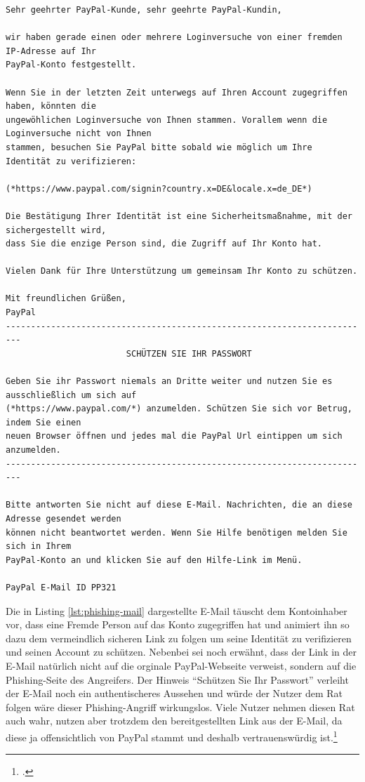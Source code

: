 \begin{scriptsize}
\begin{lstlisting}
Sehr geehrter PayPal-Kunde, sehr geehrte PayPal-Kundin,

wir haben gerade einen oder mehrere Loginversuche von einer fremden IP-Adresse auf Ihr
PayPal-Konto festgestellt.

Wenn Sie in der letzten Zeit unterwegs auf Ihren Account zugegriffen haben, könnten die
ungewöhlichen Loginversuche von Ihnen stammen. Vorallem wenn die Loginversuche nicht von Ihnen
stammen, besuchen Sie PayPal bitte sobald wie möglich um Ihre Identität zu verifizieren:

(*https://www.paypal.com/signin?country.x=DE&locale.x=de_DE*)

Die Bestätigung Ihrer Identität ist eine Sicherheitsmaßnahme, mit der sichergestellt wird,
dass Sie die enzige Person sind, die Zugriff auf Ihr Konto hat.

Vielen Dank für Ihre Unterstützung um gemeinsam Ihr Konto zu schützen.

Mit freundlichen Grüßen,
PayPal
-------------------------------------------------------------------------
                        SCHÜTZEN SIE IHR PASSWORT

Geben Sie ihr Passwort niemals an Dritte weiter und nutzen Sie es ausschließlich um sich auf
(*https://www.paypal.com/*) anzumelden. Schützen Sie sich vor Betrug, indem Sie einen
neuen Browser öffnen und jedes mal die PayPal Url eintippen um sich anzumelden.
-------------------------------------------------------------------------

Bitte antworten Sie nicht auf diese E-Mail. Nachrichten, die an diese Adresse gesendet werden
können nicht beantwortet werden. Wenn Sie Hilfe benötigen melden Sie sich in Ihrem
PayPal-Konto an und klicken Sie auf den Hilfe-Link im Menü. 

PayPal E-Mail ID PP321
\end{lstlisting}
\end{scriptsize}

Die in Listing \ref{lst:phishing-mail} dargestellte E-Mail täuscht dem Kontoinhaber vor, dass eine
Fremde Person auf das Konto zugegriffen hat und animiert ihn so dazu dem vermeindlich sicheren Link
zu folgen um seine Identität zu verifizieren und seinen Account zu schützen. Nebenbei sei noch
erwähnt, dass der Link in der E-Mail natürlich nicht auf die orginale PayPal-Webseite verweist,
sondern auf die Phishing-Seite des Angreifers. Der Hinweis \enquote{Schützen Sie Ihr Passwort}
verleiht der E-Mail noch ein authentischeres Aussehen und würde der Nutzer dem Rat folgen wäre
dieser Phishing-Angriff wirkungslos. Viele Nutzer nehmen diesen Rat auch wahr, nutzen aber trotzdem
den bereitgestellten Link aus der E-Mail, da diese ja offensichtlich von PayPal stammt und deshalb
vertrauenswürdig ist.\footcite[Vgl.][10]{phishing}

